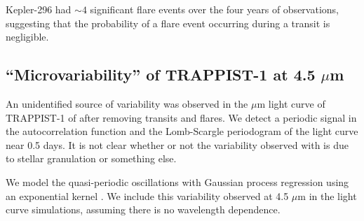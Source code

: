 Kepler-296 had $\sim 4$ significant flare events over the four years of \kepler observations, suggesting that the probability of a flare event occurring during a transit is negligible. 

\subsection{``Microvariability'' of TRAPPIST-1 at 4.5 $\mu$m}

An unidentified source of variability was observed in the  $\mu$m light curve of TRAPPIST-1 of \citet{Delrez2018} after removing transits and flares. We detect a periodic signal in the autocorrelation function and the Lomb-Scargle periodogram of the light curve near 0.5 days. It is not clear whether or not the variability observed with \spitzer is due to stellar granulation or something else.

We model the quasi-periodic oscillations with Gaussian process regression using an exponential kernel \citep{Foreman-Mackey2017}. We include this variability observed at 4.5 $\mu$m in the light curve simulations, assuming there is no wavelength dependence. 

